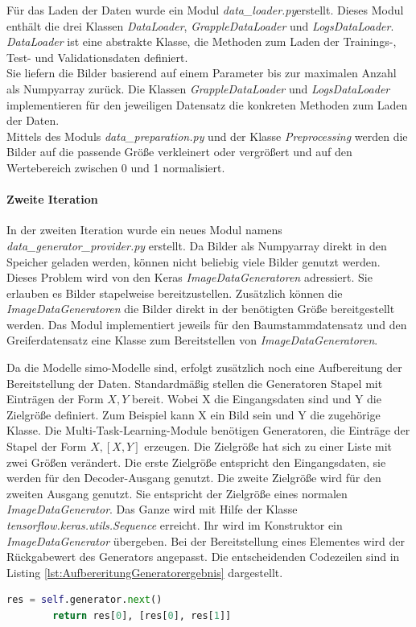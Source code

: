 	Für das Laden der Daten wurde ein Modul \textit{data\_loader.py}erstellt. Dieses Modul enthält die drei Klassen \textit{DataLoader}, \textit{GrappleDataLoader} und \textit{LogsDataLoader}. \textit{DataLoader} ist eine abstrakte Klasse, die Methoden zum Laden der Trainings-, Test- und Validationsdaten definiert. \\ 
	Sie liefern die Bilder basierend auf einem Parameter bis zur maximalen Anzahl als Numpyarray zurück. Die Klassen \textit{GrappleDataLoader} und \textit{LogsDataLoader} implementieren für den jeweiligen Datensatz die konkreten Methoden zum Laden der Daten. \\
	Mittels des Moduls \textit{data\_preparation.py} und der Klasse \textit{Preprocessing} werden die Bilder auf die passende Größe verkleinert oder vergrößert und auf den Wertebereich zwischen 0 und 1 normalisiert.
	
	\paragraph{Zweite Iteration} 
	In der zweiten Iteration wurde ein neues Modul namens \\ \textit{data\_generator\_provider.py} erstellt. Da Bilder als Numpyarray direkt in den Speicher geladen werden, können nicht beliebig viele Bilder genutzt werden. Dieses Problem wird von den Keras \textit{ImageDataGeneratoren} \cite{Chollet.2015} adressiert. Sie erlauben es Bilder stapelweise bereitzustellen. Zusätzlich können die \textit{ImageDataGeneratoren} die Bilder direkt in der benötigten Größe bereitgestellt werden. Das Modul implementiert jeweils für den Baumstammdatensatz und den Greiferdatensatz eine Klasse zum Bereitstellen von \textit{ImageDataGeneratoren}.
	
	Da die Modelle \ac{simo}-Modelle sind, erfolgt zusätzlich noch eine Aufbereitung der Bereitstellung der Daten. Standardmäßig stellen die Generatoren Stapel mit Einträgen der Form $X ,Y$  bereit. Wobei X die Eingangsdaten sind und Y die Zielgröße definiert. Zum Beispiel kann X ein Bild sein und Y die zugehörige Klasse. Die Multi-Task-Learning-Module benötigen Generatoren, die Einträge der Stapel der Form $X, [X, Y]$ erzeugen. Die Zielgröße hat sich zu einer Liste mit zwei Größen verändert. Die erste Zielgröße entspricht den Eingangsdaten, sie werden für den Decoder-Ausgang genutzt. Die zweite Zielgröße wird für den zweiten Ausgang genutzt. Sie entspricht der Zielgröße eines normalen \textit{ImageDataGenerator}. Das Ganze wird mit Hilfe der Klasse \textit{tensorflow.keras.utils.Sequence} erreicht. Ihr wird im Konstruktor ein \textit{ImageDataGenerator} übergeben. Bei der Bereitstellung eines Elementes wird der Rückgabewert des Generators angepasst. Die entscheidenden Codezeilen sind in Listing \ref{lst:AufbereritungGeneratorergebnis} dargestellt. 
	\begin{lstlisting}[language=python,caption=Aufbereitung Generatorergebnis in Python, label=lst:AufbereritungGeneratorergebnis]
		res = self.generator.next()
		return res[0], [res[0], res[1]]
	\end{lstlisting}
	
